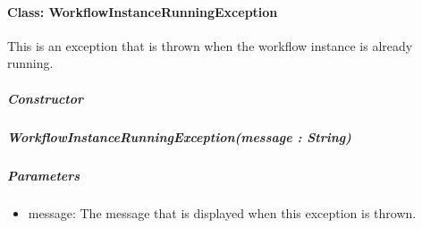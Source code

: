 \paragraph{Class: WorkflowInstanceRunningException}
This is an exception that is thrown when the workflow instance is already running.
\subparagraph{Constructor}

\subparagraph{WorkflowInstanceRunningException(message : String)}
\subparagraph{Parameters}
\begin{itemize}
    \item{message:}
    The message that is displayed when this exception is thrown.
\end{itemize}


